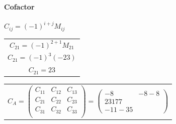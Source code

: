 \documentclass[stu, 12pt, letterpaper, donotrepeattitle, floatsintext, natbib]{apa7}
\begin{document}
\paragraph{Cofactor} $C_{ij}
=(-1)^{i+j}M_{ij}$ \\
\begin{table}[H]
\begin{tabular}{c}
$C_{21}=(-1)^{2+1}M_{21}$ \\
$C_{21}=(-1)^3(-23)$ \\
$C_{21}=23$
\end{tabular}
\hspace{5cm}
\begin{tabular}{c}
$C_A=\begin{pmatrix}
C_{11} & C_{12} & C_{13} \\
C_{21} & C_{22} & C_{23} \\
C_{31} & C_{32} & C_{33} \\
\end{pmatrix}
=
\begin{pmatrix}
-8 & -8 -8 \\
23 17 7 \\
-11 -3 5
\end{pmatrix}
$
\end{tabular} \\

\end{table}

\newpage
\renewcommand\refname{\large\textbf{Referencias}}

\end{document}
